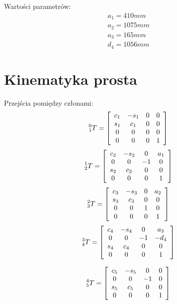 \documentclass[]{article}
\begin{document}
Wartości parametrów:
\[\begin{array}{l}
a_1 = 410 mm \\
a_2 = 1075 mm \\
a_3 = 165 mm \\
d_4 = 1056 mm
\end{array}\]

\section{Kinematyka prosta}
Przejścia pomiędzy członami:
\[\prescript{0}{1}{T}=\begin{bmatrix}
\begin{array}{cccc}
c_1 & -s_1 & 0 & 0 \\
s_1 & c_1 & 0 & 0 \\
0 & 0 & 0 & 0 \\
0 & 0 & 0 & 1 \\
\end{array}
\end{bmatrix}
\]
\[\prescript{1}{2}{T}=\begin{bmatrix}
\begin{array}{cccc}
c_2 & -s_2 & 0 & a_1 \\
0 & 0 & -1 & 0 \\
s_2 & c_2 & 0 & 0 \\
0 & 0 & 0 & 1 \\
\end{array}
\end{bmatrix}
\]
\[\prescript{2}{3}{T}=\begin{bmatrix}
\begin{array}{cccc}
c_3 & -s_3 & 0 & a_2 \\
s_3 & c_3 & 0 & 0 \\
0 & 0 & 1 & 0 \\
0 & 0 & 0 & 1 \\
\end{array}
\end{bmatrix}
\]
\[\prescript{3}{4}{T}=\begin{bmatrix}
\begin{array}{cccc}
c_4 & -s_4 & 0 & a_3 \\
0 & 0 & -1 & -d_4 \\
s_4 & c_4 & 0 & 0 \\
0 & 0 & 0 & 1 \\
\end{array}
\end{bmatrix}
\]

\[\prescript{4}{5}{T}=\begin{bmatrix}
\begin{array}{cccc}
c_5 & -s_5 & 0 & 0 \\
0 & 0 & -1 & 0 \\
s_5 & c_5 & 0 & 0 \\
0 & 0 & 0 & 1 \\
\end{array}
\end{bmatrix}
\]
\end{document}
